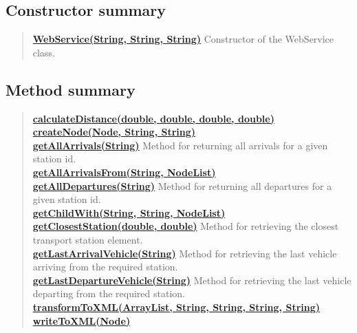 \documentclass[11pt,a4paper]{report}
\begin{document}
{{{{{{{{{{{{\subsection{Constructor summary}{
\begin{verse}
\hyperlink{core.WebService(java.lang.String, java.lang.String, java.lang.String)}{{\bf WebService(String, String, String)}} Constructor of the WebService class.\\
\end{verse}
}
\subsection{Method summary}{
\begin{verse}
\hyperlink{core.WebService.calculateDistance(double, double, double, double)}{{\bf calculateDistance(double, double, double, double)}} \\
\hyperlink{core.WebService.createNode(org.w3c.dom.Node, java.lang.String, java.lang.String)}{{\bf createNode(Node, String, String)}} \\
\hyperlink{core.WebService.getAllArrivals(java.lang.String)}{{\bf getAllArrivals(String)}} Method for returning all arrivals for a given station id.\\
\hyperlink{core.WebService.getAllArrivalsFrom(java.lang.String, org.w3c.dom.NodeList)}{{\bf getAllArrivalsFrom(String, NodeList)}} \\
\hyperlink{core.WebService.getAllDepartures(java.lang.String)}{{\bf getAllDepartures(String)}} Method for returning all departures for a given station id.\\
\hyperlink{core.WebService.getChildWith(java.lang.String, java.lang.String, org.w3c.dom.NodeList)}{{\bf getChildWith(String, String, NodeList)}} \\
\hyperlink{core.WebService.getClosestStation(double, double)}{{\bf getClosestStation(double, double)}} Method for retrieving the closest transport station element.\\
\hyperlink{core.WebService.getLastArrivalVehicle(java.lang.String)}{{\bf getLastArrivalVehicle(String)}} Method for retrieving the last vehicle arriving from the required station.\\
\hyperlink{core.WebService.getLastDepartureVehicle(java.lang.String)}{{\bf getLastDepartureVehicle(String)}} Method for retrieving the last vehicle departing from the required station.\\
\hyperlink{core.WebService.transformToXML(java.util.ArrayList, java.lang.String, java.lang.String, java.lang.String, java.lang.String)}{{\bf transformToXML(ArrayList, String, String, String, String)}} \\
\hyperlink{core.WebService.writeToXML(org.w3c.dom.Node)}{{\bf writeToXML(Node)}} \\
\end{verse}
}
}}}}}}}}}}}}
\end{document}
